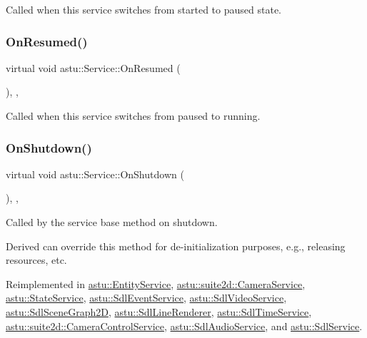 Called when this service switches from started to paused state. \mbox{\label{classastu_1_1Service_ac2817af2aa2f3a51ca230b9438d8f192}} 
\subsubsection{\texorpdfstring{On\+Resumed()}{OnResumed()}}
{\footnotesize\ttfamily virtual void astu\+::\+Service\+::\+On\+Resumed (\begin{DoxyParamCaption}{ }\end{DoxyParamCaption})\hspace{0.3cm}{\ttfamily [inline]}, {\ttfamily [protected]}, {\ttfamily [virtual]}}

Called when this service switches from paused to running. \mbox{\label{classastu_1_1Service_a1e1dff727df791c57fae782d8a613c5f}} 
\subsubsection{\texorpdfstring{On\+Shutdown()}{OnShutdown()}}
{\footnotesize\ttfamily virtual void astu\+::\+Service\+::\+On\+Shutdown (\begin{DoxyParamCaption}{ }\end{DoxyParamCaption})\hspace{0.3cm}{\ttfamily [inline]}, {\ttfamily [protected]}, {\ttfamily [virtual]}}

Called by the service base method on shutdown.

Derived can override this method for de-\/initialization purposes, e.\+g., releasing resources, etc. 

Reimplemented in \hyperlink{classastu_1_1EntityService_ac998c4d02a90460a129c8f2e0586d728}{astu\+::\+Entity\+Service}, \hyperlink{classastu_1_1suite2d_1_1CameraService_ae820e7576e925c559b773bb0dbd5f091}{astu\+::suite2d\+::\+Camera\+Service}, \hyperlink{classastu_1_1StateService_ad8fa5b6d52bd795ebba450f119540d87}{astu\+::\+State\+Service}, \hyperlink{classastu_1_1SdlEventService_a0163bd191605b5068d93cd6c8f26da0c}{astu\+::\+Sdl\+Event\+Service}, \hyperlink{classastu_1_1SdlVideoService_a6d6085e9ff213c5d41546d604ff53e92}{astu\+::\+Sdl\+Video\+Service}, \hyperlink{classastu_1_1SdlSceneGraph2D_a9d28b32e69cb7901ec2b05091b750642}{astu\+::\+Sdl\+Scene\+Graph2D}, \hyperlink{classastu_1_1SdlLineRenderer_ae34a6e853b012a77bb3377314332d7a5}{astu\+::\+Sdl\+Line\+Renderer}, \hyperlink{classastu_1_1SdlTimeService_a6a1b864beed186413933dd8b97a393a2}{astu\+::\+Sdl\+Time\+Service}, \hyperlink{classastu_1_1suite2d_1_1CameraControlService_aaf485c9ed16494fc52ce3ebe34b1e4d9}{astu\+::suite2d\+::\+Camera\+Control\+Service}, \hyperlink{classastu_1_1SdlAudioService_a9b0b73d7de890d5fa639e5c621176128}{astu\+::\+Sdl\+Audio\+Service}, and \hyperlink{classastu_1_1SdlService_a20d53237efd1c717d773a8ff121b093b}{astu\+::\+Sdl\+Service}.

